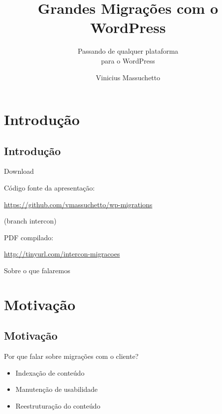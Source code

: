 \documentclass[handout]{beamer}
\title{Grandes Migrações com o WordPress}
\subtitle{Passando de qualquer plataforma \\
  para o WordPress}
\author{Vinicius Massuchetto}
\date{}
\begin{document}
\frame{\titlepage}

\section{Introdução}
\subsection{Introdução}

\begin{frame}{Download}
  \begin{center}

    Código fonte da apresentação:

    \vspace{0.1cm}

    \url{https://github.com/vmassuchetto/wp-migrations}

    \vspace{0.1cm}

    \footnotesize{(branch intercon)}

    \vspace{1cm}

    PDF compilado:

    \vspace{0.1cm}

    \url{http://tinyurl.com/intercon-migracoes}

  \end{center}
\end{frame}

\begin{frame}{Sobre o que falaremos}
  \tableofcontents[subsectionstyle=hide]
\end{frame}

\section{Motivação}
\subsection{Motivação}

\begin{frame}{Por que falar sobre migrações com o cliente?}
\begin{itemize}
  \pause \item Indexação de conteúdo
  \pause \item Manutenção de usabilidade
  \pause \item Reestruturação do conteúdo
\end{itemize}
\end{frame}
\end{document}
